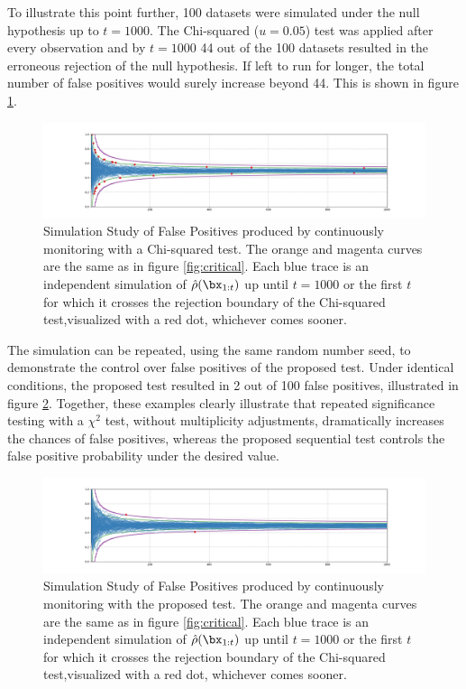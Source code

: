 \documentclass[11pt]{article}
\begin{document}
  To illustrate this point further, 100 datasets were simulated under the null hypothesis up to $t=1000$.
The Chi-squared ($u=0.05$) test was applied after every observation and by $t=1000$ 44 out of the 100 datasets resulted in the erroneous rejection of the null hypothesis.
If left to run for longer, the total number of false positives would surely increase beyond 44.
This is shown in figure \ref{fig:chi_fp}.
  \begin{figure}[h!]
  \centering
  \includegraphics[scale=0.35]{images/chi_fp.png}
  \caption{Simulation Study of False Positives produced by continuously monitoring with a Chi-squared test.
The orange and magenta curves are the same as in figure \ref{fig:critical}.
Each blue trace is an independent simulation of $\hat{\rho}(\bx_{1:t})$ up until $t=1000$ or the first $t$ for which it crosses the rejection boundary of the Chi-squared test,visualized with a red dot, whichever comes sooner.
}
    \label{fig:chi_fp}
  \end{figure}
  The simulation can be repeated, using the same random number seed, to demonstrate the control over false positives of the proposed test.
Under identical conditions, the proposed test resulted in 2 out of 100 false positives, illustrated in figure \ref{fig:ssrm_fp}.
Together, these examples clearly illustrate that repeated significance testing with a $\chi^2$ test, without multiplicity adjustments, dramatically increases the chances
of false positives, whereas the proposed sequential test controls the false positive probability under the desired value. 
    \begin{figure}[H]
  \centering
  \includegraphics[scale=0.35]{images/ssrm_fp.png}
  \caption{Simulation Study of False Positives produced by continuously monitoring with the proposed test.
The orange and magenta curves are the same as in figure \ref{fig:critical}.
Each blue trace is an independent simulation of $\hat{\rho}(\bx_{1:t})$ up until $t=1000$ or the first $t$ for which it crosses the rejection boundary of the Chi-squared test,visualized with a red dot, whichever comes sooner.
}
    \label{fig:ssrm_fp}
  \end{figure}
\end{document}
